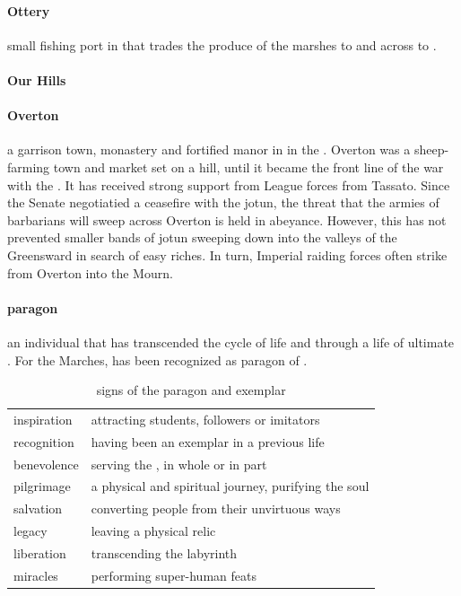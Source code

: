 \paragraph{Ottery} small fishing port in  that trades the produce of the marshes to  and across  to .
\paragraph{Our Hills} 
\paragraph{Overton} a garrison town, monastery and fortified manor in  in the . Overton was a sheep-farming town and market set on a hill, until it became the front line of the war with the . It has received strong support from League forces from Tassato. Since the Senate negotiatied a ceasefire with the jotun, the threat that the armies of barbarians will sweep across Overton is held in abeyance. However, this has not prevented smaller bands of jotun sweeping down into the valleys of the Greensward in search of easy riches. In turn, Imperial raiding forces often strike from Overton into the Mourn.
\paragraph{paragon} an individual that has transcended the cycle of life and  through a life of ultimate . For the Marches,  has been recognized as paragon of . \begin{table} \centering \begin{tabular}{ll} inspiration & attracting students, followers or imitators \\ recognition & having been an exemplar in a previous life \\ benevolence & serving the \s{Empire}, in whole or in part \\ pilgrimage & a physical and spiritual journey, purifying the soul \\ salvation & converting people from their unvirtuous ways \\ legacy & leaving a physical relic \\\hline liberation & transcending the labyrinth \\ miracles & performing super-human feats \end{tabular}\caption{signs of the paragon and exemplar}\end{table}
